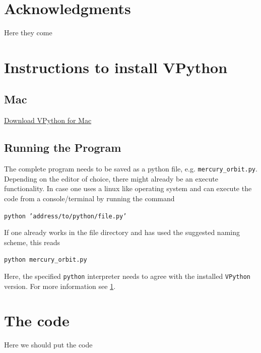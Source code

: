 \documentclass[12pt, UK english]{iopart}
\begin{document}
\appendix



\section*{Acknowledgments}
Here they come



\section{Instructions to install VPython}\label{appendix:python}
\subsection{Mac}

\href{http://vpython.org/contents/download_mac.html}{Download VPython for Mac}


\subsection{Running the Program}
The complete program needs to be saved as a python file, e.g. \texttt{mercury\_orbit.py}.
Depending on the editor of choice, there might already be an execute functionality.
In case one uses a linux like operating system and can execute the code from a console/terminal by running the command
\begin{center}
	\texttt{python 'address/to/python/file.py'}
\end{center}
If one already works in the file directory and has used the suggested naming scheme, this reads 
\begin{center}
	\texttt{python mercury\_orbit.py}
\end{center}
Here, the specified \texttt{python} interpreter needs to agree with the installed \texttt{VPython} version.
For more information see \ref{appendix:python}.

\section{The code}\label{sec:code}
Here we should put the code



%
%
\end{document}
